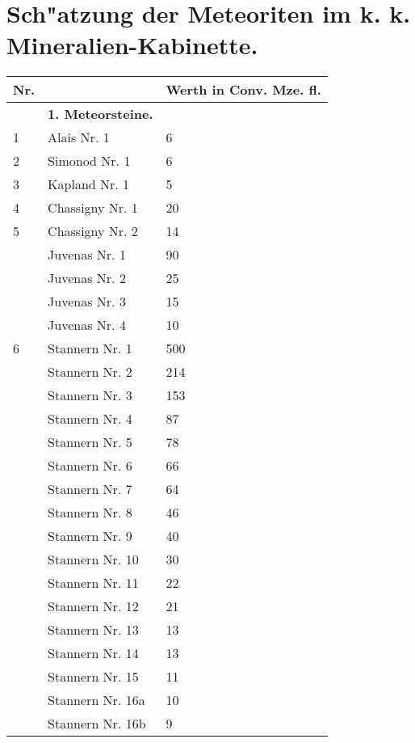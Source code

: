 \documentclass[a4paper, 11pt, oneside, polutonikogreek, german]{article}
\begin{document}
\section{Sch"atzung der Meteoriten im k. k. Mineralien-Kabinette.}
\begin{center}
    \begin{longtable}{|l|l|l|}
    \hline
        Nr. &   & Werth in Conv. Mze. fl. \\ \hline
          & \textbf{1. Meteorsteine.} &   \\ \hline
        1 & Alais Nr. 1 & 6 \\ \hline
        2 & Simonod Nr. 1 & 6 \\ \hline
        3 & Kapland Nr. 1 & 5 \\ \hline
        4 & Chassigny Nr. 1 & 20 \\ \hline
        5 & Chassigny Nr. 2 & 14 \\ \hline
          & Juvenas Nr. 1 & 90 \\ \hline
          & Juvenas Nr. 2 & 25 \\ \hline
          & Juvenas Nr. 3 & 15 \\ \hline
          & Juvenas Nr. 4 & 10 \\ \hline
        6 & Stannern Nr. 1 & 500 \\ \hline
          & Stannern Nr. 2 & 214 \\ \hline
          & Stannern Nr. 3 & 153 \\ \hline
          & Stannern Nr. 4 & 87 \\ \hline
          & Stannern Nr. 5 & 78 \\ \hline
          & Stannern Nr. 6 & 66 \\ \hline
          & Stannern Nr. 7 & 64 \\ \hline
          & Stannern Nr. 8 & 46 \\ \hline
          & Stannern Nr. 9 & 40 \\ \hline
          & Stannern Nr. 10 & 30 \\ \hline
          & Stannern Nr. 11 & 22 \\ \hline
          & Stannern Nr. 12 & 21 \\ \hline
          & Stannern Nr. 13 & 13 \\ \hline
          & Stannern Nr. 14 & 13 \\ \hline
          & Stannern Nr. 15 & 11 \\ \hline
          & Stannern Nr. 16a & 10 \\ \hline
          & Stannern Nr. 16b & 9 \\ \hline

\end{longtable}
\end{center}
\end{document}
